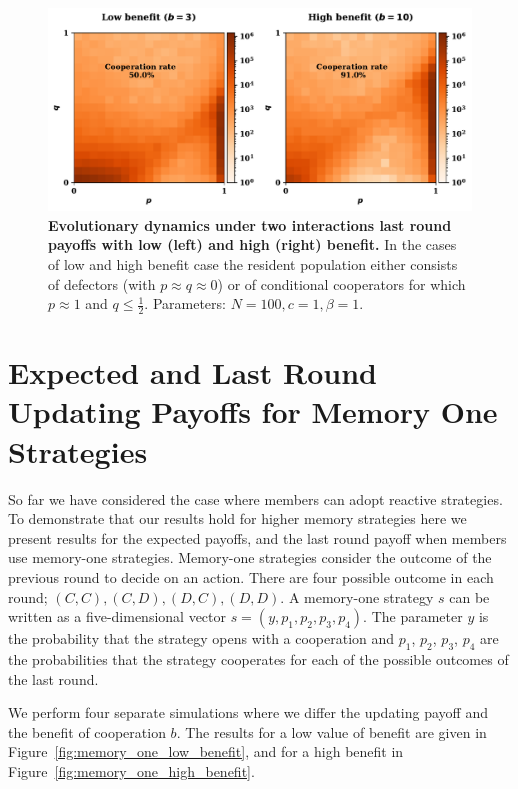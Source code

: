 \documentclass[11pt]{article}
\theoremstyle{plainCl1}
\theoremstyle{plainCl2}
\begin{document}
\begin{figure}[!htbp]
  \centering 
  \includegraphics[width=.70\textwidth]{static/two_rounds_opponents_donation_game.pdf}
  \caption{\textbf{Evolutionary dynamics under two interactions last round
  payoffs with low (left) and high (right) benefit.} In the cases of low and
  high benefit case the resident population either consists of defectors (with
  \(p \approx q \approx 0\)) or of conditional cooperators for which \(p \approx
  1\) and \(q \leq \frac{1}{2}\). Parameters: \(N =100, c=1, \beta=1\).
  }\label{fig:two_rounds_opponents_results}
\end{figure}

\newpage

\section{Expected and Last Round Updating Payoffs for Memory One Strategies}

So far we have considered the case where members can adopt reactive strategies.
To demonstrate that our results hold for higher memory strategies here we
present results for the expected payoffs, and the last round payoff when members
use memory-one strategies. Memory-one strategies consider the outcome of the
previous round to decide on an action. There are four possible outcome in each
round; \((C, C), (C, D), (D, C), (D, D)\). A memory-one strategy \(s\) can be
written as a five-dimensional vector \(s=(y, p_1, p_2, p_3, p_4)\). The
parameter \(y\) is the probability that the strategy opens with a cooperation
and \(p_1\), \(p_2\), \(p_3\), \(p_4\) are the probabilities that the strategy
cooperates for each of the possible outcomes of the last round.

We perform four separate simulations where we differ the updating payoff and the
benefit of cooperation \(b\). The results for a low value of benefit are given
in Figure~\ref{fig:memory_one_low_benefit}, and for a high benefit in
Figure~\ref{fig:memory_one_high_benefit}.
\end{document}
